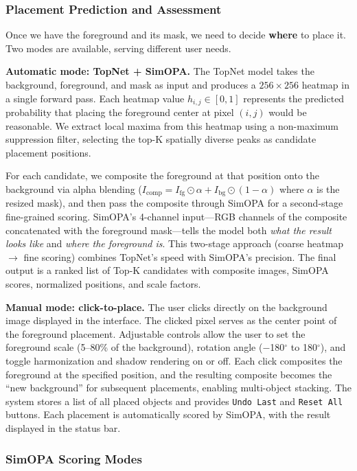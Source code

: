 \documentclass[10pt,twocolumn]{article}
\begin{document}
\subsubsection{Placement Prediction and Assessment}

Once we have the foreground and its mask, we need to decide \textbf{where} to place it. Two modes are available, serving different user needs.

\textbf{Automatic mode: TopNet + SimOPA.} The TopNet model takes the background, foreground, and mask as input and produces a $256\times 256$ heatmap in a single forward pass. Each heatmap value $h_{i,j} \in [0,1]$ represents the predicted probability that placing the foreground center at pixel $(i,j)$ would be reasonable. We extract local maxima from this heatmap using a non-maximum suppression filter, selecting the top-K spatially diverse peaks as candidate placement positions.

For each candidate, we composite the foreground at that position onto the background via alpha blending ($I_{\text{comp}} = I_{\text{fg}} \odot \alpha + I_{\text{bg}} \odot (1-\alpha)$ where $\alpha$ is the resized mask), and then pass the composite through SimOPA for a second-stage fine-grained scoring. SimOPA's 4-channel input---RGB channels of the composite concatenated with the foreground mask---tells the model both \textit{what the result looks like} and \textit{where the foreground is}. This two-stage approach (coarse heatmap $\rightarrow$ fine scoring) combines TopNet's speed with SimOPA's precision. The final output is a ranked list of Top-K candidates with composite images, SimOPA scores, normalized positions, and scale factors.

\textbf{Manual mode: click-to-place.} The user clicks directly on the background image displayed in the interface. The clicked pixel serves as the center point of the foreground placement. Adjustable controls allow the user to set the foreground scale (5--80\% of the background), rotation angle ($-$180$^\circ$ to 180$^\circ$), and toggle harmonization and shadow rendering on or off. Each click composites the foreground at the specified position, and the resulting composite becomes the ``new background'' for subsequent placements, enabling multi-object stacking. The system stores a list of all placed objects and provides \texttt{Undo Last} and \texttt{Reset All} buttons. Each placement is automatically scored by SimOPA, with the result displayed in the status bar.

\subsubsection{SimOPA Scoring Modes}
\end{document}
